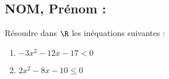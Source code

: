 \documentclass[a4paper,11pt,exos]{nsi} %
\begin{document}


\subsection*{NOM, Prénom : \dotfill} 

\maketitle

\begin{exercice}
    Résoudre dans $\R$ les inéquations suivantes :
    \begin{multicols}{2}
        \begin{enumerate}
            \item $-3x^2-12x-17< 0$
	        \item $2x^2-8x-10\leq 0$
        \end{enumerate}
    \end{multicols}
    
\end{exercice}

\end{document}
